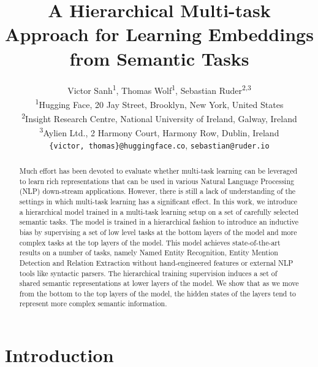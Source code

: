 \documentclass[letterpaper]{article} %
\begin{document}
\title{A Hierarchical Multi-task Approach for Learning Embeddings from Semantic Tasks}
\author{Victor Sanh\textsuperscript{1}, Thomas Wolf\textsuperscript{1}, Sebastian Ruder\textsuperscript{2,3}\\
\textsuperscript{1}{Hugging Face, 20 Jay Street, Brooklyn, New York, United States}\\
\textsuperscript{2}{Insight Research Centre, National University of Ireland, Galway, Ireland}\\
\textsuperscript{3}{Aylien Ltd., 2 Harmony Court, Harmony Row, Dublin, Ireland}\\
\texttt{\{victor, thomas\}@huggingface.co}, \texttt{sebastian@ruder.io}
}


\maketitle

\begin{abstract}
    Much effort has been devoted to evaluate whether multi-task learning can be leveraged to learn rich representations that can be used in various Natural Language Processing (NLP) down-stream applications. However, there is still a lack of understanding of the settings in which multi-task learning has a significant effect. In this work, we introduce a hierarchical model trained in a multi-task learning setup on a set of carefully selected semantic tasks. The model is trained in a hierarchical fashion to introduce an inductive bias by supervising a set of low level tasks at the bottom layers of the model and more complex tasks at the top layers of the model. This model achieves state-of-the-art results on a number of tasks, namely Named Entity Recognition, Entity Mention Detection and Relation Extraction without hand-engineered features or external NLP tools like syntactic parsers. The hierarchical training supervision induces a set of shared semantic representations at lower layers of the model. We show that as we move from the bottom to the top layers of the model, the hidden states of the layers tend to represent more complex semantic information.
\end{abstract}



\section{Introduction}
\end{document}
